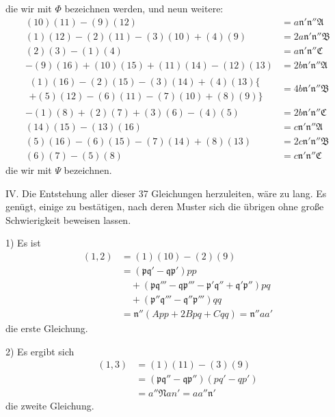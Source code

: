 die wir mit $\Phi$ bezeichnen werden, und neun weitere:
\[
\begin{aligned}
(10)(11)-(9)(12)&=a\mathfrak{n}'\mathfrak{n}''\mathfrak{A}\\
(1)(12)-(2)(11)-(3)(10)+(4)(9)&=2a\mathfrak{n}'\mathfrak{n}''\mathfrak{B}\\
(2)(3)-(1)(4)&=a\mathfrak{n}'\mathfrak{n}''\mathfrak{C}\\
-(9)(16)+(10)(15)+(11)(14)-(12)(13)&=2b\mathfrak{n}'\mathfrak{n}''\mathfrak{A}\\
\begin{gathered}
(1)(16)-(2)(15)-(3)(14)+(4)(13)\{\\
+(5)(12)-(6)(11)-(7)(10)+(8)(9)\}
\end{gathered}&=4b\mathfrak{n}'\mathfrak{n}''\mathfrak{B}\\
-(1)(8)+(2)(7)+(3)(6)-(4)(5)&=2b\mathfrak{n}'\mathfrak{n}''\mathfrak{C}\\
(14)(15)-(13)(16)&=c\mathfrak{n}'\mathfrak{n}''\mathfrak{A}\\
(5)(16)-(6)(15)-(7)(14)+(8)(13)&=2c\mathfrak{n}'\mathfrak{n}''\mathfrak{B}\\
(6)(7)-(5)(8)&=c\mathfrak{n}'\mathfrak{n}''\mathfrak{C}
\end{aligned}
\]
die wir mit $\Psi$ bezeichnen.

IV. Die Entstehung aller dieser 37 Gleichungen herzuleiten, wäre zu lang. Es genügt, einige zu bestätigen, nach deren Muster sich die übrigen ohne große Schwierigkeit beweisen lassen.

\leavevmode{}
1) Es ist
\[
\begin{aligned}
(1,2)&=(1)(10)-(2)(9)\\
&=(\mathfrak{p}\mathfrak{q}'-\mathfrak{q}\mathfrak{p}')pp\\&\quad+(\mathfrak{p}\mathfrak{q}'''-\mathfrak{q}\mathfrak{p}'''-\mathfrak{p}'\mathfrak{q}''+\mathfrak{q}'\mathfrak{p}'')pq\\&\quad+(\mathfrak{p}''\mathfrak{q}'''-\mathfrak{q}''\mathfrak{p}''')qq\\
&=\mathfrak{n}''(App+2Bpq+Cqq)=\mathfrak{n}''aa'
\end{aligned}
\]
die erste Gleichung.

2) Es ergibt sich
\[
\begin{aligned}(1,3)&=(1)(11)-(3)(9)\\&=(\mathfrak{p}\mathfrak{q}''-\mathfrak{q}\mathfrak{p}'')(pq'-qp')\\&=a''\mathfrak{N}an'=aa''\mathfrak{n}'\end{aligned}
\]
die zweite Gleichung.

